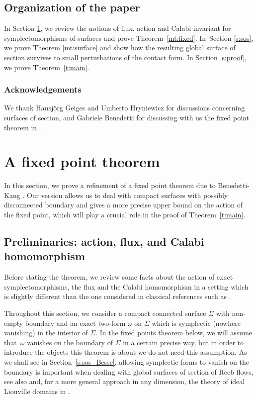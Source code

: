 \subsection{Organization of the paper}
In Section \ref{s:fixed_point}, we review the notions of flux, action and Calabi invariant for symplectomorphisms of surfaces and prove Theorem~\ref{mt:fixed}. In~Section \ref{s:sos}, we prove Theorem \ref{mt:surface} and show how the resulting global surface of section survives to small perturbations of the contact form. In Section \ref{s:proof}, we prove Theorem~\ref{t:main}.

\subsubsection*{Acknowledgements}
We thank Hansjörg Geiges and Umberto Hryniewicz for discussions concerning surfaces of section, and Gabriele Benedetti for discussing with us the fixed point theorem in \cite{Benedetti:2021aa}.

\section{A fixed point theorem}
\label{s:fixed_point}

In this section, we prove a refinement of a fixed point theorem due to Benedetti-Kang \cite[\S 4.4]{Benedetti:2021aa}. Our version allows us to deal with compact surfaces with possibly disconnected boundary and gives a more precise upper bound on the action of the fixed point, which will play a crucial role in the proof of Theorem~\ref{t:main}.

\subsection{Preliminaries: action, flux, and Calabi homomorphism}
Before stating the theorem, we review some facts about the action of exact symplectomorphisms, the flux and the Calabi homomorphism in a setting which is slightly different than the one considered in classical references such as \cite{Calabi:1970,Banyaga:1978,Banyaga:1997,McDuff:1998uu}.

Throughout this section, we consider a compact connected surface $\Sigma$ with non-empty boundary and an exact two-form $\omega$ on $\Sigma$ which is symplectic (\ie nowhere vanishing) in the interior of $\Sigma$. In the fixed points theorem below, we will assume that~$\omega$ vanishes on the boundary of $\Sigma$ in a certain precise way, but in order to introduce the objects this theorem is about we do not need this assumption. As we shall see in Section~\ref{s:sos_Besse}, allowing symplectic forms to vanish on the boundary is important when dealing with global surfaces of section of Reeb flows, see also \cite{Abbondandolo:2018fb,Benedetti:2021aa} and, for a more general approach in any dimension, the theory of ideal Liouville domains in \cite{Giroux:2020}.

